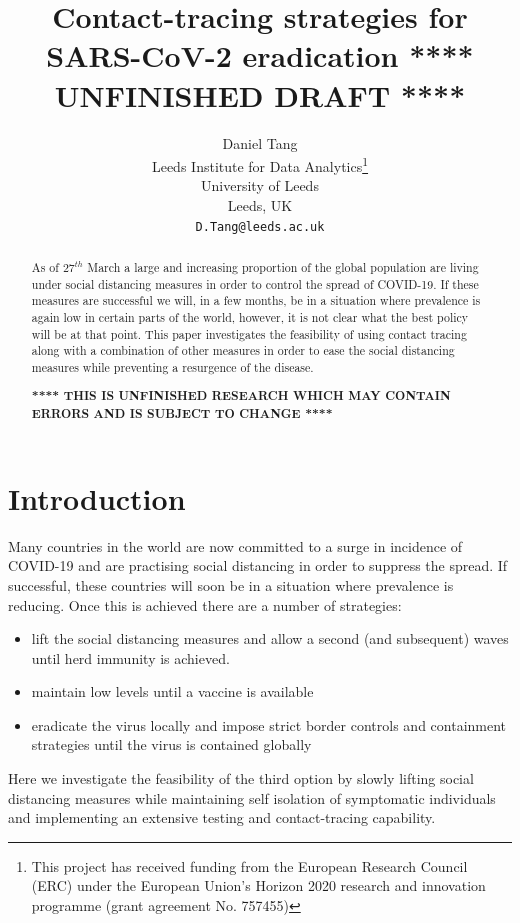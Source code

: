 \documentclass{article}
\title{Contact-tracing strategies for SARS-CoV-2 eradication
\textbf{**** UNFINISHED DRAFT ****}
}
\author{
  Daniel Tang\\
  Leeds Institute for Data Analytics\thanks{This project has received funding from the European Research Council (ERC) under the European Union’s Horizon 2020 research and innovation programme (grant agreement No. 757455)}\\
  University of Leeds\\
  Leeds, UK\\
  \texttt{D.Tang@leeds.ac.uk} \\
}
\begin{document}
\maketitle

\begin{abstract}
As of $27^{th}$ March a large and increasing proportion of the global population are living under social distancing measures in order to control the spread of COVID-19. If these measures are successful we will, in a few months, be in a situation where prevalence is again low in certain parts of the world, however, it is not clear what the best policy will be at that point. This paper investigates the feasibility of using contact tracing along with a combination of other measures in order to ease the social distancing measures while preventing a resurgence of the disease.

\textbf{**** THIS IS UNFINISHED RESEARCH WHICH MAY CONTAIN ERRORS AND IS SUBJECT TO CHANGE ****}
\end{abstract}


\section{Introduction}

Many countries in the world are now committed to a surge in incidence of COVID-19 and are practising social distancing in order to suppress the spread. If successful, these countries will soon be in a situation where prevalence is reducing. Once this is achieved there are a number of strategies:
\begin{itemize}

\item lift the social distancing measures and allow a second (and subsequent) waves until herd immunity is achieved\cite{ferguson2020impact}.

\item maintain low levels until a vaccine is available

\item eradicate the virus locally and impose strict border controls and containment strategies until the virus is contained globally
\end{itemize}

Here we investigate the feasibility of the third option by slowly lifting social distancing measures while maintaining self isolation of symptomatic individuals and implementing an extensive testing and contact-tracing capability.
\end{document}
